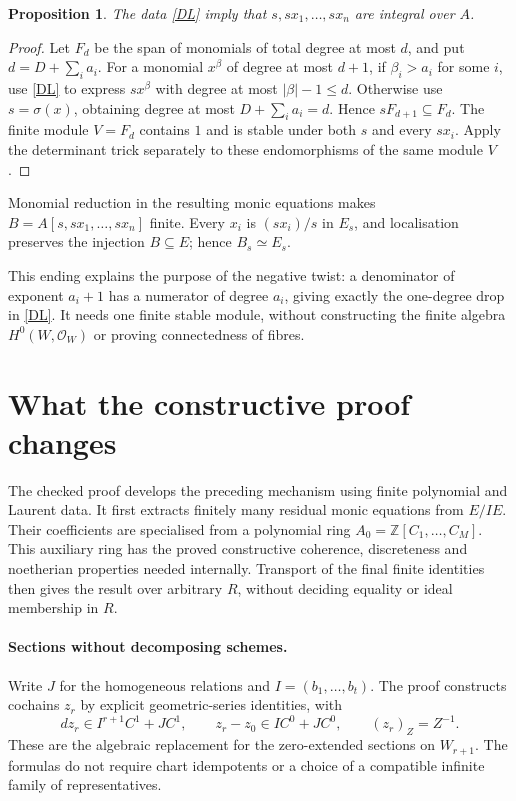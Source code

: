 \documentclass[11pt]{amsart}
\newtheorem{proposition}{Proposition}[section]
\newcommand{\OO}{\mathcal O}
\begin{document}
\begin{proposition}
The data \eqref{DL} imply that $s,sx_1,\ldots,sx_n$ are integral over $A$.
\end{proposition}
\begin{proof}
Let $F_d$ be the span of monomials of total degree at most $d$, and put
$d=D+\sum_i a_i$. For a monomial $x^\beta$ of degree at most $d+1$,
if $\beta_i>a_i$ for some $i$, use \eqref{DL} to express $sx^\beta$
with degree at most $|\beta|-1\le d$. Otherwise use $s=\sigma(x)$,
obtaining degree at most $D+\sum_i a_i=d$. Hence $sF_{d+1}\subseteq F_d$.
The finite module $V=F_d$ contains $1$ and is stable under both $s$
and every $sx_i$. Apply the determinant trick separately to these
endomorphisms of the same module $V$.
\end{proof}

Monomial reduction in the resulting monic equations makes
$B=A[s,sx_1,\ldots,sx_n]$ finite. Every $x_i$ is $(sx_i)/s$ in $E_s$,
and localisation preserves the injection $B\subseteq E$; hence
$B_s\simeq E_s$.

This ending explains the purpose of the negative twist: a denominator
of exponent $a_i+1$ has a numerator of degree $a_i$, giving exactly
the one-degree drop in \eqref{DL}. It needs one finite stable module,
without constructing the finite algebra $H^0(W,\OO_W)$ or proving
connectedness of fibres.

\section{What the constructive proof changes}

The checked proof develops the preceding mechanism using finite
polynomial and Laurent data. It first extracts finitely many residual
monic equations from $E/IE$. Their coefficients are specialised from
a polynomial ring $A_0=\mathbb Z[C_1,\ldots,C_M]$. This auxiliary ring
has the proved constructive coherence, discreteness and noetherian
properties needed internally. Transport of the final finite identities
then gives the result over arbitrary $R$, without deciding equality
or ideal membership in $R$.

\paragraph{Sections without decomposing schemes.}
Write $J$ for the homogeneous relations and $I=(b_1,\ldots,b_t)$.
The proof constructs cochains $z_r$ by explicit geometric-series
identities, with
\[
 dz_r\in I^{r+1}C^1+JC^1,\qquad
 z_r-z_0\in IC^0+JC^0,\qquad (z_r)_Z=Z^{-1}.
\]
These are the algebraic replacement for the zero-extended sections on
$W_{r+1}$. The formulas do not require chart idempotents or a choice
of a compatible infinite family of representatives.
\end{document}
